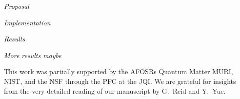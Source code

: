 \documentclass[
superscriptaddress,
amsmath,
amssymb,
aps,
prl,
floatfix
]{revtex4-1}
\begin{document}
{\it Proposal} 

%
%

{\it Implementation} 

%
%

{\it Results}  

%
%


{\it More results maybe} 

%
%


\begin{acknowledgments}
This work was partially supported by the AFOSRs Quantum Matter MURI, NIST, and the NSF through the PFC at the JQI.
We are grateful for insights from the very detailed reading of our manuscript by G.~Reid and Y.~Yue.
\end{acknowledgments}


\end{document}
